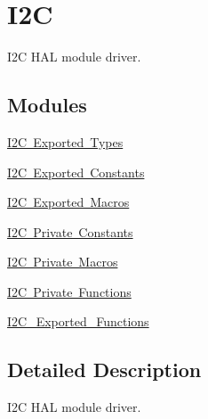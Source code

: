 \hypertarget{group___i2_c}{}\section{I2C}
\label{group___i2_c}


I2C H\+AL module driver.  


\subsection*{Modules}
\begin{DoxyCompactItemize}
\item 
\mbox{\hyperlink{group___i2_c___exported___types}{I2\+C Exported Types}}
\item 
\mbox{\hyperlink{group___i2_c___exported___constants}{I2\+C Exported Constants}}
\item 
\mbox{\hyperlink{group___i2_c___exported___macros}{I2\+C Exported Macros}}
\item 
\mbox{\hyperlink{group___i2_c___private___constants}{I2\+C Private Constants}}
\item 
\mbox{\hyperlink{group___i2_c___private___macro}{I2\+C Private Macros}}
\item 
\mbox{\hyperlink{group___i2_c___private___functions}{I2\+C Private Functions}}
\item 
\mbox{\hyperlink{group___i2_c___exported___functions}{I2\+C\+\_\+\+Exported\+\_\+\+Functions}}
\end{DoxyCompactItemize}


\subsection{Detailed Description}
I2C H\+AL module driver. 

